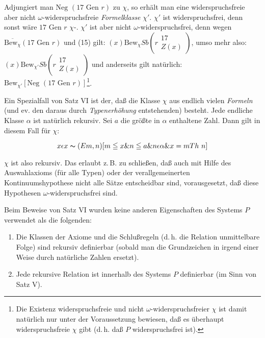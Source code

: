 \documentclass[draft]{scrartcl}
\begin{document}
Adjungiert man $\text{Neg }\left(17 \text{ Gen } r\right)$ zu $\chi$,
so erhält man eine widerspruchsfreie aber nicht $\omega$-widerspruchsfreie 
\textit{Formelklasse} $\chi'$. $\chi'$ ist widerspruchsfrei, denn sonst wäre 
$17 \text{ Gen } r$ $\chi$-.
$\chi'$ ist aber nicht $\omega$-widerspruchsfrei, denn wegen 
$\overline{\text{Bew}_\chi}\left(17\text{ Gen } r\right)$ und (15) gilt: 
$\left(x\right) \text{Bew}_\chi Sb\left(r\substack{17\\ Z\left(x\right)}\right)$, umso mehr also:
$\left(x\right)\text{Bew}_{\chi'} Sb\left(r\substack{17\\ Z\left(x\right)}\right)$ 
und anderseits gilt natürlich: 
$\text{Bew}_{\chi'}\left[\text{Neg }\left(17\text{ Gen }r\right)\right]$\footnote{Die Existenz 
widerspruchsfreie und nicht $\omega$-widerspruchsfreier $\chi$ ist damit natürlich nur 
unter der Voraussetzung bewiesen, daß es überhaupt widerspruchsfreie 
$\chi$ gibt (d.\,h. daß $P$ widerspruchsfrei ist).}.

Ein Spezialfall von Satz VI ist der, daß die Klasse $\chi$ aus endlich
vielen \textit{Formeln} (und ev. den daraus durch \textit{Typenerhöhung} 
entstehenden) besteht. Jede endliche Klasse $\alpha$ ist natürlich rekursiv.
Sei $a$ die größte in $\alpha$ enthaltene Zahl. Dann gilt in diesem
Fall für $\chi$:

$$
x \epsilon x \thicksim \left(Em, n\right) \left[m \leqq x \& n \leqq a \& n \epsilon \alpha \& x = m Th\ n\right]
$$

$\chi$ ist also rekursiv. Das erlaubt z.\,B. zu schließen, daß auch mit Hilfe des Auswahlaxioms (für alle Typen) oder der verallgemeinerten Kontinuumshypothese
nicht alle Sätze entscheidbar sind, vorausgesetzt, daß diese Hypothesen $\omega$-widerspruchsfrei sind.

Beim Beweise von Satz VI wurden keine anderen Eigenschaften des Systems $P$ verwendet als die folgenden:

\begin{enumerate}
	\item Die Klassen der Axiome und die Schlußregeln
	 (d.\,h. die Relation \glqq unmittelbare Folge\grqq) sind rekursiv definierbar (sobald man die Grundzeichen in irgend einer Weise durch natürliche Zahlen ersetzt).
	 \item Jede rekursive Relation ist innerhalb des Systems $P$ definierbar (im Sinn von Satz V).
\end{enumerate}
\end{document}
